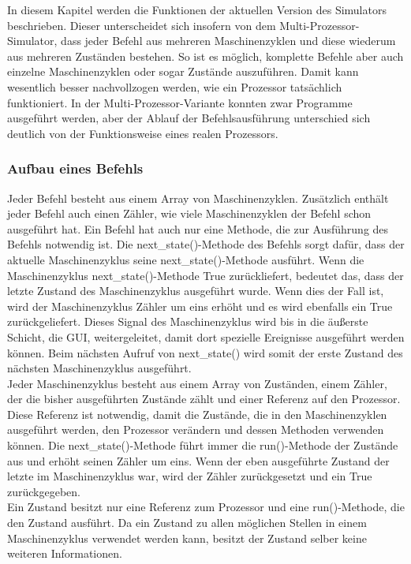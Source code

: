 \documentclass[12pt]{article}
\begin{document}
\noindent
In diesem Kapitel werden die Funktionen der aktuellen Version des Simulators beschrieben. Dieser unterscheidet sich insofern von dem Multi-Prozessor-Simulator, dass jeder Befehl aus mehreren Maschinenzyklen und diese wiederum aus mehreren Zuständen bestehen. So ist es möglich, komplette Befehle aber auch einzelne Maschinenzyklen oder sogar Zustände auszuführen. Damit kann wesentlich besser nachvollzogen werden, wie ein Prozessor tatsächlich funktioniert. In der Multi-Prozessor-Variante konnten zwar Programme ausgeführt werden, aber der Ablauf der Befehlsausführung unterschied sich deutlich von der Funktionsweise eines realen Prozessors.

\subsubsection{Aufbau eines Befehls}

Jeder Befehl besteht aus einem Array von Maschinenzyklen. Zusätzlich enthält jeder Befehl auch einen Zähler, wie viele Maschinenzyklen der Befehl schon ausgeführt hat. Ein Befehl hat auch nur eine Methode, die zur Ausführung des Befehls notwendig ist. Die next\_state()-Methode des Befehls sorgt dafür, dass der aktuelle Maschinenzyklus seine next\_state()-Methode ausführt. Wenn die Maschinenzyklus next\_state()-Methode True zurückliefert, bedeutet das, dass der letzte Zustand des Maschinenzyklus ausgeführt wurde. Wenn dies der Fall ist, wird der Maschinenzyklus Zähler um eins erhöht und es wird ebenfalls ein True zurückgeliefert. Dieses Signal des Maschinenzyklus wird bis in die äußerste Schicht, die GUI, weitergeleitet, damit dort spezielle Ereignisse ausgeführt werden können. Beim nächsten Aufruf von next\_state() wird somit der erste Zustand des nächsten Maschinenzyklus ausgeführt.
\\

\noindent
Jeder Maschinenzyklus besteht aus einem Array von Zuständen, einem Zähler, der die bisher ausgeführten Zustände zählt und einer Referenz auf den Prozessor. Diese Referenz ist notwendig, damit die Zustände, die in den Maschinenzyklen ausgeführt werden, den Prozessor verändern und dessen Methoden verwenden können. Die next\_state()-Methode führt immer die run()-Methode der Zustände aus und erhöht seinen Zähler um eins. Wenn der eben ausgeführte Zustand der letzte im Maschinenzyklus war, wird der Zähler zurückgesetzt und ein True zurückgegeben.
\\

\noindent
Ein Zustand besitzt nur eine Referenz zum Prozessor und eine run()-Methode, die den Zustand ausführt. Da ein Zustand zu allen möglichen Stellen in einem Maschinenzyklus verwendet werden kann, besitzt der Zustand selber keine weiteren Informationen.
\end{document}
